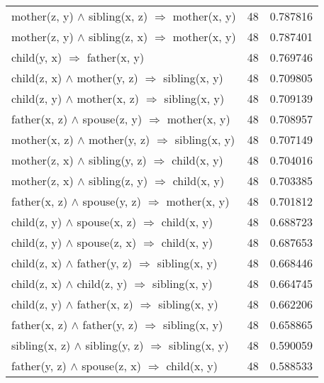 \begin{longtable}{lrr}
     mother(z, y) $\wedge$ sibling(x, z)   $\Rightarrow$ mother(x, y) &           48 &        0.787816 \\
     mother(z, y) $\wedge$ sibling(z, x)   $\Rightarrow$ mother(x, y) &           48 &        0.787401 \\
                       child(y, x)   $\Rightarrow$ father(x, y) &           48 &        0.769746 \\
      child(z, x) $\wedge$ mother(y, z)   $\Rightarrow$ sibling(x, y) &           48 &        0.709805 \\
      child(z, y) $\wedge$ mother(x, z)   $\Rightarrow$ sibling(x, y) &           48 &        0.709139 \\
      father(x, z) $\wedge$ spouse(z, y)   $\Rightarrow$ mother(x, y) &           48 &        0.708957 \\
     mother(x, z) $\wedge$ mother(y, z)   $\Rightarrow$ sibling(x, y) &           48 &        0.707149 \\
      mother(z, x) $\wedge$ sibling(y, z)   $\Rightarrow$ child(x, y) &           48 &        0.704016 \\
      mother(z, x) $\wedge$ sibling(z, y)   $\Rightarrow$ child(x, y) &           48 &        0.703385 \\
      father(x, z) $\wedge$ spouse(y, z)   $\Rightarrow$ mother(x, y) &           48 &        0.701812 \\
        child(z, y) $\wedge$ spouse(x, z)   $\Rightarrow$ child(x, y) &           48 &        0.688723 \\
        child(z, y) $\wedge$ spouse(z, x)   $\Rightarrow$ child(x, y) &           48 &        0.687653 \\
      child(z, x) $\wedge$ father(y, z)   $\Rightarrow$ sibling(x, y) &           48 &        0.668446 \\
       child(z, x) $\wedge$ child(z, y)   $\Rightarrow$ sibling(x, y) &           48 &        0.664745 \\
      child(z, y) $\wedge$ father(x, z)   $\Rightarrow$ sibling(x, y) &           48 &        0.662206 \\
     father(x, z) $\wedge$ father(y, z)   $\Rightarrow$ sibling(x, y) &           48 &        0.658865 \\
   sibling(x, z) $\wedge$ sibling(y, z)   $\Rightarrow$ sibling(x, y) &           48 &        0.590059 \\
       father(y, z) $\wedge$ spouse(z, x)   $\Rightarrow$ child(x, y) &           48 &        0.588533 \\

\end{longtable}
